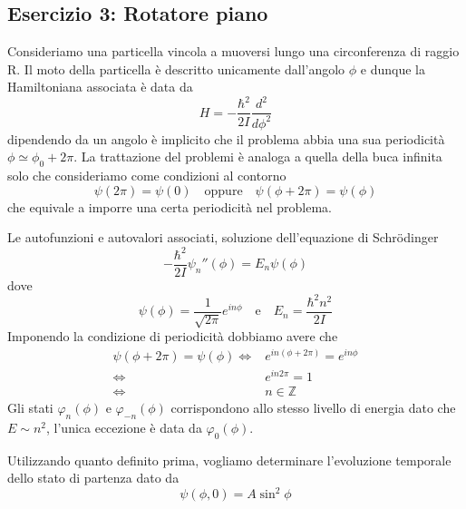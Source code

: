 \subsection{Esercizio 3: Rotatore piano}

Consideriamo una particella vincola a muoversi lungo una circonferenza di raggio R. Il moto della particella \`e descritto unicamente dall'angolo $\phi$ e dunque la Hamiltoniana associata \`e data da 
\begin{equation*}
	H = -\frac{\hbar^2}{2I} \frac{d^2}{d\phi^2}
\end{equation*}
dipendendo da un angolo \`e implicito che il problema abbia una sua periodicit\`a $\phi \simeq \phi_0 + 2 \pi$. La trattazione del problemi \`e analoga a quella della buca infinita solo che consideriamo come condizioni al contorno
\begin{equation*}
	\psi(2\pi) = \psi(0) \quad \text{oppure} \quad \psi(\phi+2\pi) = \psi(\phi)
\end{equation*}
che equivale a imporre una certa periodicit\`a nel problema. 

Le autofunzioni e autovalori associati, soluzione dell'equazione di Schr\"odinger
\begin{equation*}
	-\frac{\hbar^2}{2I}\psi_n''(\phi) = E_n\psi(\phi)
\end{equation*}
dove 
\begin{equation*}
	\psi(\phi) = \frac{1}{\sqrt{2\pi}}e^{in\phi} \quad \text{e} \quad E_n = \frac{\hbar^2 n^2}{2I} 
\end{equation*}
Imponendo la condizione di periodicit\`a dobbiamo avere che 
\begin{align*}
	\psi(\phi + 2\pi) = \psi(\phi) \iff & e^{in(\phi + 2\pi)} = e^{in\phi} \\[0.5cm]
	\iff & e^{in 2\pi} = 1 \\[0.5cm]
	\iff & n \in \mathbb{Z}
\end{align*}
Gli stati $\varphi_n(\phi)$ e $ \varphi_{-n}(\phi)$ corrispondono allo stesso livello di energia dato che $E \sim n^2$, l'unica eccezione \`e data da $\varphi_0(\phi)$.
\newline

Utilizzando quanto definito prima, vogliamo determinare l'evoluzione temporale dello stato di partenza dato da 
\begin{equation*}
	\psi(\phi,0) = A \sin^2\phi
\end{equation*}
\newpage

